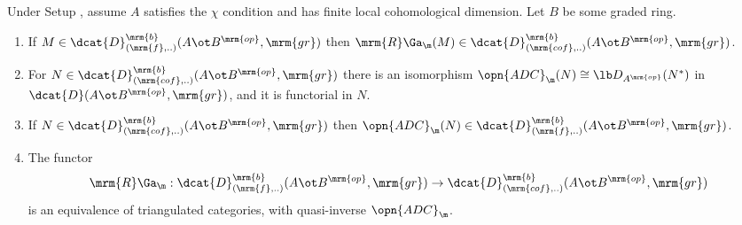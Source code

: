 \begin{thm} \label{thm:4070}
Under Setup \tup{\ref{setup:3925}}, assume $A$ satisfies the $\chi$ condition 
and has finite local cohomological dimension. Let $B$ be some graded ring. 
\begin{enumerate}
\item If 
$M \in \dcat{D}^{\mrm{b}}_{(\mrm{f}, ..)}(A \ot B^{\mrm{op}}, \mrm{gr})$
then 
$\mrm{R} \Ga_{\m}(M) \in 
\dcat{D}^{\mrm{b}}_{(\mrm{cof}, ..)}(A \ot B^{\mrm{op}}, \mrm{gr})$.

\item For 
$N \in \dcat{D}^{\mrm{b}}_{(\mrm{cof}, ..)}(A \ot B^{\mrm{op}}, \mrm{gr})$
there is an isomorphism 
$\opn{ADC}_{\m}(N) \cong \lb D_{A^{\mrm{op}}}(N^*)$ 
in $\dcat{D}(A \ot B^{\mrm{op}}, \mrm{gr})$,
and it is functorial in $N$. 

\item If 
$N \in \dcat{D}^{\mrm{b}}_{(\mrm{cof}, ..)}(A \ot B^{\mrm{op}}, \mrm{gr})$
then 
$\opn{ADC}_{\m}(N) \in 
\dcat{D}^{\mrm{b}}_{(\mrm{f}, ..)}(A \ot B^{\mrm{op}}, \mrm{gr})$.

\item The functor 
\[ \mrm{R} \Ga_{\m} : 
\dcat{D}^{\mrm{b}}_{(\mrm{f}, ..)}(A \ot B^{\mrm{op}}, \mrm{gr}) \to 
\dcat{D}^{\mrm{b}}_{(\mrm{cof}, ..)}(A \ot B^{\mrm{op}}, \mrm{gr}) \]
is an equivalence of triangulated categories, with quasi-inverse 
$\opn{ADC}_{\m}$. 
\end{enumerate}
\end{thm}

